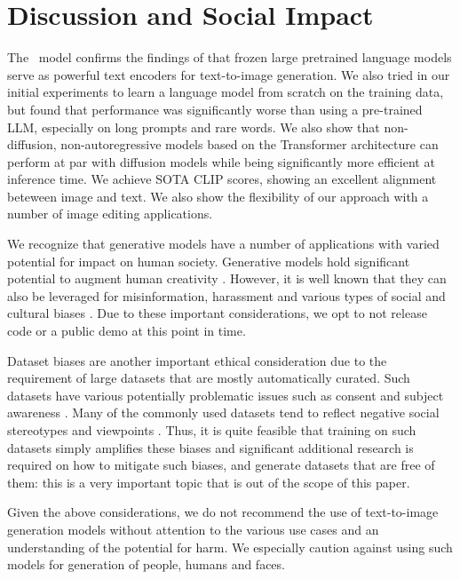 \section{Discussion and Social Impact}
The \name~model confirms the findings of \citep{imagen} that frozen large pretrained language models serve as powerful text encoders for
text-to-image generation. We also tried in our initial experiments to learn a language model from scratch on the training data, but found that performance was significantly worse than using a pre-trained LLM, especially on long prompts and rare words. We also show that non-diffusion, non-autoregressive models based on the Transformer architecture can perform at par with diffusion models while being significantly more efficient at inference time. We achieve SOTA CLIP scores, showing an excellent alignment beteween image and text. We also show the flexibility of our approach with a number of image editing applications.

We recognize that generative models have a number of applications with varied potential for impact on human society. Generative models \citep{imagen,parti,ldm,midjourney} hold significant potential to augment human creativity \citep{hughes2021generative}. However, it is well known that they can also be leveraged for misinformation, harassment and various types of social and cultural biases \citep{franks2018sex,whittaker2020all,srinivasan2021biases,steed2021image}. Due to these important considerations, we opt to not release code or a public demo at this point in time. 

Dataset biases are another important ethical consideration due to the requirement of large datasets that are mostly automatically curated. Such datasets have various potentially problematic issues such as consent and subject awareness \citep{paullada2021data, dulhanty2020issues,scheuerman2021datasets}. Many of the commonly used datasets tend to reflect negative social stereotypes and viewpoints \citep{prabhu2020large}. Thus, it is quite feasible that training on such datasets simply amplifies these biases and significant additional research is required on how to mitigate such biases, and generate datasets that are free of them: this is a very important topic \citep{buolamwini2018gender,hendricks2018women} that is out of the scope of this paper. 

Given the above considerations, we do not recommend the use of text-to-image generation models without attention to the various use cases and an understanding of the potential for harm. We especially caution against using such models for generation of people, humans and faces.